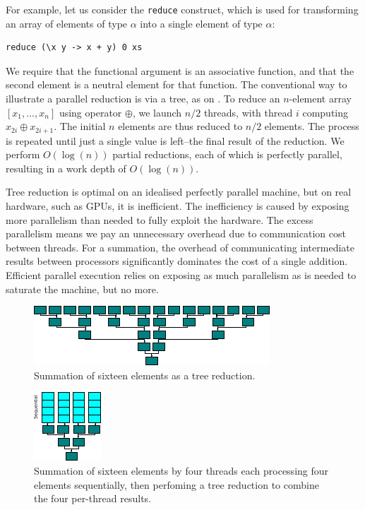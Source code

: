 For example, let us consider the \lstinline{reduce} construct, which
is used for transforming an array of elements of type $\alpha$ into a
single element of type $\alpha$:

\begin{lstlisting}
reduce (\x y -> x + y) 0 xs
\end{lstlisting}

We require that the functional argument is an associative function,
and that the second element is a neutral element for that function.
The conventional way to illustrate a parallel reduction is via a tree,
as on .  To reduce an $n$-element array
$[x_{1},\ldots,x_{n}]$ using operator $\oplus$, we launch $n/2$
threads, with thread $i$ computing $x_{2i}\oplus{}x_{2i+1}$.  The
initial $n$ elements are thus reduced to $n/2$ elements.  The process
is repeated until just a single value is left--the final result of the
reduction.  We perform $O(\log(n))$ partial reductions, each of which
is perfectly parallel, resulting in a work depth of
$O(\log(n))$.

Tree reduction is optimal on an idealised perfectly parallel machine,
but on real hardware, such as GPUs, it is inefficient.  The
inefficiency is caused by exposing more parallelism than needed to
fully exploit the hardware.  The excess parallelism means we pay an
unnecessary overhead due to communication cost between threads.  For a
summation, the overhead of communicating intermediate results between
processors significantly dominates the cost of a single addition.
Efficient parallel execution relies on exposing as much parallelism as
is needed to saturate the machine, but no more.

\begin{figure}
  \centering
  \includegraphics[scale=2]{img/tree_reduction.pdf}
  \caption{Summation of sixteen elements as a tree reduction.}
  \label{fig:tree-summation}
\end{figure}

\begin{figure}
  \centering
  \includegraphics[scale=2]{img/chunked_reduction.pdf}
  \caption{Summation of sixteen elements by four threads each
    processing four elements sequentially, then perfoming a tree
    reduction to combine the four per-thread results.}
  \label{fig:chunked-summation}
\end{figure}


